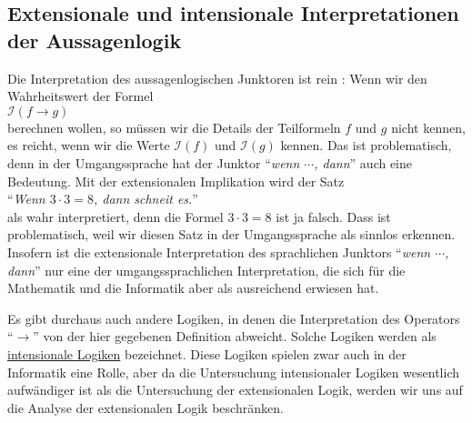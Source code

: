 \subsection{Extensionale und intensionale Interpretationen der Aussagenlogik}
Die Interpretation des aussagenlogischen Junktoren ist rein :
Wenn wir den Wahrheitswert der Formel
\\[0.2cm]
\hspace*{1.3cm}
$\mathcal{I}(f \rightarrow g)$ 
\\[0.2cm]
berechnen wollen, so müssen wir die Details der Teilformeln $f$ und $g$ nicht kennen, es reicht,
wenn wir die Werte $\mathcal{I}(f)$ und $\mathcal{I}(g)$ kennen.   Das ist problematisch,
denn in der Umgangssprache hat der Junktor
``\textsl{wenn $\cdots$, dann}'' auch eine  Bedeutung.  Mit der extensionalen
Implikation wird der Satz
\\[0.2cm]
\hspace*{1.3cm}
``\textsl{Wenn $3 \cdot 3 = 8$, dann schneit es.}''
\\[0.2cm]
als wahr interpretiert, denn die Formel $3 \cdot 3 = 8$ ist ja falsch.  Dass ist problematisch, weil wir diesen Satz in der Umgangssprache 
als sinnlos erkennen.  Insofern ist die extensionale Interpretation des sprachlichen Junktors
``\textsl{wenn $\cdots$, dann}'' nur eine  der umgangssprachlichen Interpretation, die sich für die
Mathematik und die Informatik aber als ausreichend erwiesen hat.

Es gibt durchaus auch andere Logiken, in denen die Interpretation des Operators ``$\rightarrow$'' von der
hier gegebenen Definition abweicht.  Solche Logiken werden als
\href{https://en.wikipedia.org/wiki/Intensional_logic}{intensionale Logiken} bezeichnet.  Diese Logiken spielen
zwar auch in der Informatik eine Rolle, aber da die Untersuchung intensionaler Logiken wesentlich
aufwändiger ist als die Untersuchung der extensionalen Logik, werden wir uns auf die Analyse der
extensionalen Logik beschränken.   

